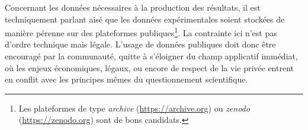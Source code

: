 Concernant les données nécessaires à la production des résultats, il est techniquement parlant aisé que les données expérimentales soient stockées de manière pérenne sur des plateformes publiques\footnote{Les plateformes de type \textit
{archive} (\url{https://archive.org}) ou \textit
{zenodo} (\url{https://zenodo.org}) sont de bons candidats.}. La contrainte ici n'est pas d'ordre technique mais légale. L'usage de données publiques doit donc être encouragé par la communauté, quitte à s'éloigner du champ applicatif immédiat, où les enjeux économiques, légaux, ou encore de respect de la vie privée entrent en conflit avec les principes mêmes du questionnement scientifique.
